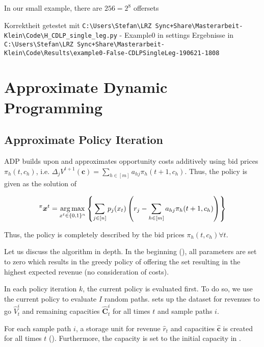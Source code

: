 In our small example, there are $256 = 2^8$ offersets

Korrektheit getestet mit \texttt{C:\textbackslash{}Users\textbackslash{}Stefan\textbackslash{}LRZ Sync+Share\textbackslash{}Masterarbeit-Klein\textbackslash{}Code\textbackslash{}H\_CDLP\_single\_leg.py} - Example0 in settings
Ergebnisse in \texttt{ C:\textbackslash{}Users\textbackslash{}Stefan\textbackslash{}LRZ Sync+Share\textbackslash{}Masterarbeit-Klein\textbackslash{}Code\textbackslash{}Results\textbackslash{}example0-False-CDLPSingleLeg-190621-1808}


\clearpage
\setcounter{page}{1}
\noindent{}

\section{Approximate Dynamic Programming}

\subsection{Approximate Policy Iteration}

ADP builds upon  and approximates opportunity costs additively using bid prices $\pi_h(t, c_h)$, i.e. $\Delta_j V^{t+1}(\boldsymbol{c}) = \sum_{h \in [m]} a_{hj}\pi_{h}(t+1, c_h)$. Thus, the policy is given as the solution of

\begin{align}
^\pi \boldsymbol{x}^t = \operatorname*{arg\,max}_{x^t \in \{0,1\}^n}\left\{ \sum_{j \in [n]} p_j(x_t) \left( r_j - \sum_{h \in [m]} a_{hj}\pi_{h}(t+1, c_h) \right) \right\} 
\end{align}

Thus, the policy is completely described by the bid prices $\pi_h(t, c_h) \forall t$.

Let us discuss the algorithm in depth. In the beginning (), all parameters are set to zero which results in the greedy policy of offering the set resulting in the highest expected revenue (no consideration of costs). 

In each policy iteration $k$, the current policy is evaluated first. To do so, we use the current policy to evaluate $I$ random paths.  sets up the dataset for revenues to go $\hat{V}_t^i$ and remaining capacities $\mathbf{\hat{C}}_t^i$ for all times $t$ and sample paths $i$. 

For each sample path $i$, a storage unit for revenue $\hat{r}_t$ and capacities $\mathbf{\hat{c}}$ is created for all times $t$ (). Furthermore, the capacity is set to the initial capacity in .

